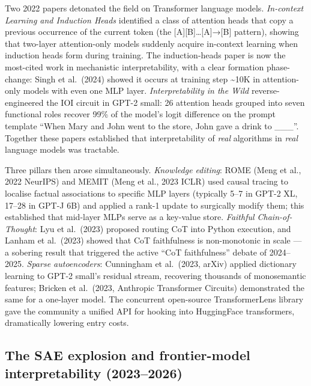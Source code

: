 \documentclass{article}
\begin{document}
Two 2022 papers detonated the field on Transformer language models. \emph{In-context Learning and Induction Heads} \citep{olsson2022incontextlearninga} identified a class of attention heads that copy a previous occurrence of the current token (the {[}A{]}{[}B{]}\ldots{[}A{]}→{[}B{]} pattern), showing that two-layer attention-only models suddenly acquire in-context learning when induction heads form during training. The induction-heads paper is now the most-cited work in mechanistic interpretability, with a clear formation phase-change: Singh et al.~(2024) showed it occurs at training step \textasciitilde10K in attention-only models with even one MLP layer. \emph{Interpretability in the Wild} \citep{wang2022interpretabilityin} reverse-engineered the IOI circuit in GPT-2 small: 26 attention heads grouped into seven functional roles recover 99\% of the model's logit difference on the prompt template ``When Mary and John went to the store, John gave a drink to \_\_\_''. Together these papers established that interpretability of \emph{real} algorithms in \emph{real} language models was tractable.

Three pillars then arose simultaneously. \emph{Knowledge editing}: ROME (Meng et al., 2022 NeurIPS) and MEMIT (Meng et al., 2023 ICLR) used causal tracing to localise factual associations to specific MLP layers (typically 5--7 in GPT-2 XL, 17--28 in GPT-J 6B) and applied a rank-1 update to surgically modify them; this established that mid-layer MLPs serve as a key-value store. \emph{Faithful Chain-of-Thought}: Lyu et al.~(2023) proposed routing CoT into Python execution, and Lanham et al.~(2023) showed that CoT faithfulness is non-monotonic in scale --- a sobering result that triggered the active ``CoT faithfulness'' debate of 2024--2025. \emph{Sparse autoencoders}: Cunningham et al.~(2023, arXiv) applied dictionary learning to GPT-2 small's residual stream, recovering thousands of monosemantic features; Bricken et al.~(2023, Anthropic Transformer Circuits) demonstrated the same for a one-layer model. The concurrent open-source TransformerLens library \citep{nanda2023progressmeasuresfo} gave the community a unified API for hooking into HuggingFace transformers, dramatically lowering entry costs.

\subsection{The SAE explosion and frontier-model interpretability (2023--2026)}\label{the-sae-explosion-and-frontier-model-interpretability-20232026}
\end{document}
